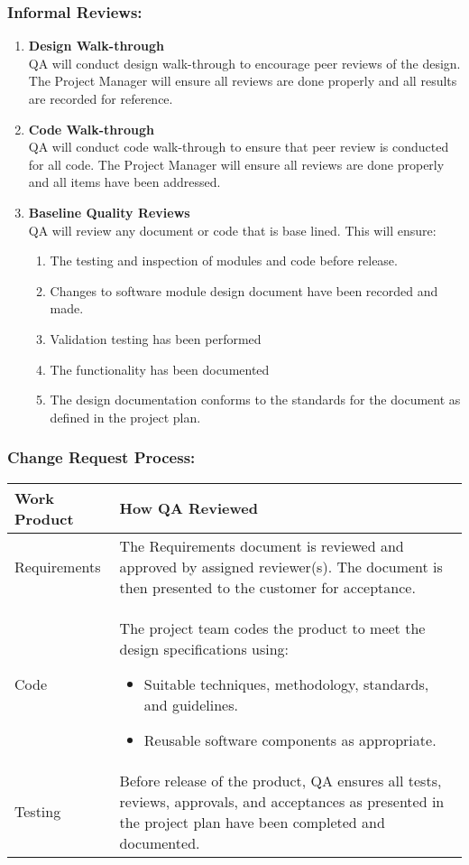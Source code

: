 \documentclass[a3paper, 11pt]{article}
\begin{document}
\subsubsection{Informal Reviews:}
\begin{enumerate}[label=\Alph*.]
	\setlength\itemsep{-0.25em}
	\item \textbf{Design Walk-through\\} QA will conduct design walk-through to encourage peer reviews of the design. The Project Manager will ensure all reviews are done properly and all results are recorded for reference. 
	\item \textbf{Code Walk-through\\} QA will conduct code walk-through to ensure that peer review is conducted for all code. The Project Manager will ensure all reviews are done properly and all items have been addressed.
	\item \textbf{Baseline Quality Reviews\\} QA will review any document or code that is base lined. This will ensure:
	\begin{enumerate}
		\item The testing and inspection of modules and code before release.
		\item Changes to software module design document have been recorded and made.
		\item Validation testing has been performed
		\item The functionality has been documented
		\item The design documentation conforms to the standards for the document as defined in the project plan. 
	\end{enumerate}
\end{enumerate}

\subsubsection{Change Request Process:}
\begin{tabular} {|p{2cm}|p{13.4cm}|}
	\hline
	\textbf{Work Product} & \textbf{How QA Reviewed} \\ \hline
	Requirements & The Requirements document is reviewed and approved by assigned reviewer(s). The document is then presented to the customer for acceptance. \\ \hline
	Code & The project team codes the product to meet the design specifications using: 
	\begin{itemize}
		\setlength\itemsep{-0.25em}
		\item Suitable techniques, methodology, standards, and guidelines. 
		\item Reusable software components as appropriate.
	\end{itemize}
	\\ \hline
	Testing & Before release of the product, QA ensures all tests, reviews, approvals, and acceptances as presented in the project plan have been completed and documented. \\ \hline
\end{tabular}
\end{document}
